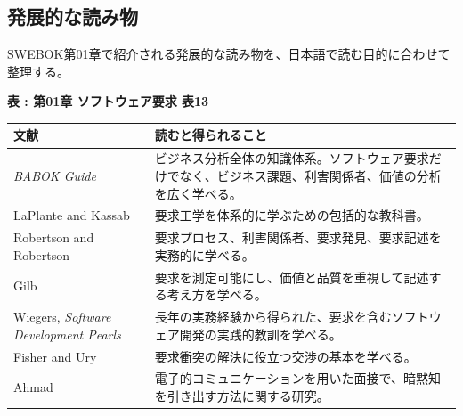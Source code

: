 \subsection{発展的な読み物}

SWEBOK第01章で紹介される発展的な読み物を、日本語で読む目的に合わせて整理する。

\par\smallskip\noindent{}\label{tab:ch01-13}\textbf{表 \thetable: 第01章 ソフトウェア要求 表13}\par\smallskip
\begin{tabularx}{0.97\linewidth}{@{}p{.31\linewidth}X@{}}
\toprule
文献 & 読むと得られること \\
\midrule
\textit{BABOK Guide} & ビジネス分析全体の知識体系。ソフトウェア要求だけでなく、ビジネス課題、利害関係者、価値の分析を広く学べる。 \\
LaPlante and Kassab & 要求工学を体系的に学ぶための包括的な教科書。 \\
Robertson and Robertson & 要求プロセス、利害関係者、要求発見、要求記述を実務的に学べる。 \\
Gilb & 要求を測定可能にし、価値と品質を重視して記述する考え方を学べる。 \\
Wiegers, \textit{Software Development Pearls} & 長年の実務経験から得られた、要求を含むソフトウェア開発の実践的教訓を学べる。 \\
Fisher and Ury & 要求衝突の解決に役立つ交渉の基本を学べる。 \\
Ahmad & 電子的コミュニケーションを用いた面接で、暗黙知を引き出す方法に関する研究。 \\
\bottomrule
\end{tabularx}
